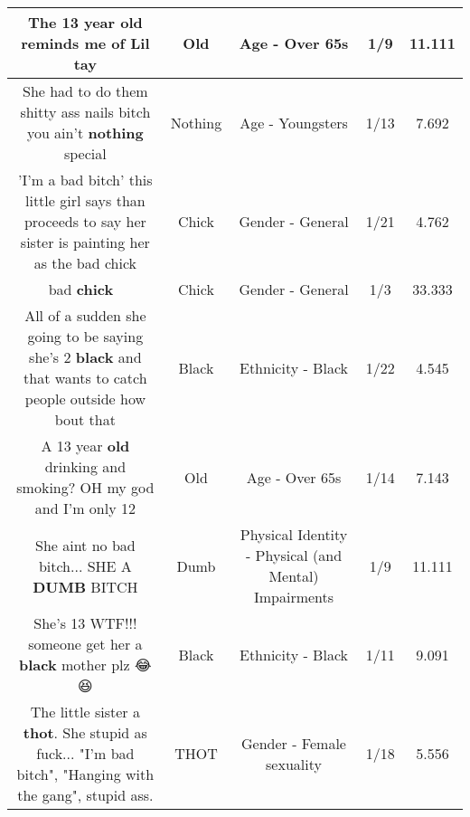 \documentclass[11pt]{article}
\newlength\mylength
\begin{document}
\begin{center}
\begin{longtable}{|C{.65\mylength}|C{.30\mylength}|C{.12\mylength}|C{.12\mylength}|C{.12\mylength}|}
  \small The 13 year \textbf{old} reminds me of Lil tay\normalsize   & Old & Age - Over 65s & 1/9 & 11.111 \\  \hline
  \small She had to do them shitty ass nails bitch you ain't \textbf{nothing} special\normalsize   & Nothing & Age - Youngsters & 1/13 & 7.692 \\  \hline
  \small 'I'm a bad bitch' this little girl says than proceeds to say her sister is painting her as the bad chick\normalsize   & Chick & Gender - General & 1/21 & 4.762 \\  \hline
  \small bad \textbf{chick} 🐥\normalsize   & Chick & Gender - General & 1/3 & 33.333 \\  \hline
  \small All of a sudden she going to be saying she's 2 \textbf{black} and that wants to catch people outside how bout that\normalsize   & Black & Ethnicity - Black & 1/22 & 4.545 \\  \hline
  \small A 13 year \textbf{old} drinking and smoking? OH my god and I'm only 12\normalsize   & Old & Age - Over 65s & 1/14 & 7.143 \\  \hline
  \small She aint no bad bitch... SHE A \textbf{DUMB} BITCH\normalsize   & Dumb & Physical Identity - Physical (and Mental) Impairments & 1/9 & 11.111 \\  \hline
  \small She's 13 WTF!!! someone get her a \textbf{black} mother plz 😂😆\normalsize   & Black & Ethnicity - Black & 1/11 & 9.091 \\  \hline
  \small The little sister a \textbf{thot}. She stupid as fuck... "I'm bad bitch", "Hanging with the gang", stupid ass.\normalsize   & THOT & Gender - Female sexuality & 1/18 & 5.556 \\  \hline

\end{longtable}
\end{center}
\end{document}
